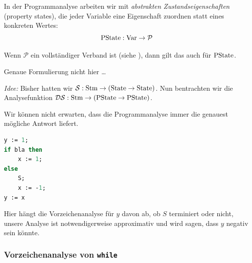In der Programmanalyse arbeiten wir mit \emph{abstrakten Zustandseigenschaften} (property states), die jeder Variable eine Eigenschaft zuordnen statt eines konkreten Wertes: \[
    \operatorname{PState}: \operatorname{Var} \to \mathcal{P}
\]

\begin{lemma}
    Wenn $\mathcal{P}$ ein vollständiger Verband ist (siehe ), dann gilt das auch für $\operatorname{PState}$.

    Genaue Formulierung nicht hier \dots
\end{lemma}

\par\bigskip
\emph{Idee:} Bisher hatten wir $\mathcal{S} : \operatorname{Stm} \to (\operatorname{State} \to \operatorname{State})$. Nun bentrachten wir die Analysefunktion $\mathcal{DS}: \operatorname{Stm} \to (\operatorname{PState} \to \operatorname{PState})$.

\begin{remark}[Halteproblem]
    Wir können nicht erwarten, dass die Programmanalyse immer die genauest mögliche Antwort liefert.

\begin{lstlisting}[language=Pascal]
y := 1;
if bla then
    x := 1;
else
    S;
    x := -1;
y := x
\end{lstlisting}

    Hier hängt die Vorzeichenanalyse für $y$ davon ab, ob $S$ terminiert oder nicht, \dh{} unsere Analyse ist notwendigerweise approximativ und wird sagen, dass $y$ negativ sein könnte.
\end{remark}



\subsubsection{Vorzeichenanalyse von \texttt{while}}

